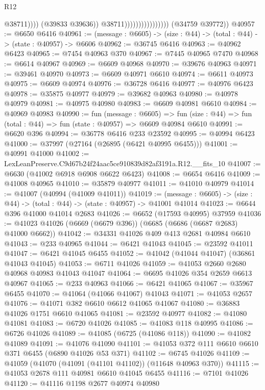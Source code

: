\begin{lexlean}{R12}
\begin{coremodule}
                                                @38711))))
                                        (@39833 @39636))
                                      @38711))))))))))))))))
      (@34759 @39772))
@40957 := @6650 @6416
@40961 := (message : @6605) -> (size : @44) -> (total : @44) -> (state : @40957) -> @6606
@40962 := @36745 @6416
@40963 := @40962 @6423
@40965 := @7454 @40963 @370
@40967 := @7445 @40965 @7470
@40968 := @6614 @40967
@40969 := @6609 @40968
@40970 := @39676 @40963
@40971 := @39461 @40970
@40973 := @6609 @40971 @6610
@40974 := @6611 @40973
@40975 := @6609 @40974
@40976 := @36728 @6416
@40977 := @40976 @6423
@40978 := @35875 @40977
@40979 := @39682 @40963
@40980 := @40978 @40979
@40981 := @40975 @40980
@40983 := @6609 @40981 @6610
@40984 := @40969 @40983
@40990 := fun (message : @6605) =>
  fun (size : @44) => fun (total : @44) => fun (state : @40957) => @6609 @40984 @6610
@40991 := @6620 @396
@40994 := @36778 @6416 @233 @23592
@40995 := @40994 @6423
@41000 := @37997 (@27164 (@26895 (@6421 @40995 @6455)))
@41001 := @40991 @41000
@41002 := LexLeanPreserve.C9d67b24f24aac5ce910839d82af3191a.R12.__fits_10
@41007 := @6630 (@41002 @6918 @6908 @6622 @6423)
@41008 := @6654 @6416
@41009 := @41008 @40965
@41010 := @35879 @40977
@41011 := @41010 @40979
@41014 := @41007 (@40994 (@41009 @41011))
@41019 := (message : @6605) -> (size : @44) -> (total : @44) -> (state : @40957) -> @41001 @41014
@41023 := @6644 @396 @41000 @41014 @2683
@41026 := @6652 (@17593 @40995) @37959
@41036 := @41023 @41026 (@6669 (@6679 @396)) (@6685 (@6686 (@6687 @2683) @41000 @6662))
@41042 := @34331 @41026 @409 @413 @2681 @40984 @6610
@41043 := @233 @40965
@41044 := @6421 @41043
@41045 := @23592 @41011
@41047 := @6421 @41045 @6455
@41052 := @41042 (@41044 @41047) (@36861 @41043 @41045)
@41053 := @6711 @41026
@41059 := @41053 @2660 @2680 @40968 @40983 @41043 @41047
@41064 := @6695 @41026 @354 @2659 @6613 @40967
@41065 := @233 @40963
@41066 := @6421 @41065
@41067 := @35967 @6455
@41070 := @41064 (@41066 @41067) @41043
@41071 := @41053 @2657
@41076 := @41071 @382 @6610 @6612 @41065 @41067
@41080 := @36883 @41026 @1751 @6610 @41065
@41081 := @23592 @40977
@41082 := @41080 @41081
@41083 := @6720 @41026
@41085 := @41083 @118 @40995
@41086 := @6726 @41026
@41089 := @41085 (@6725 (@41086 @118))
@41090 := @41082 @41089
@41091 := @41076 @41090
@41101 := @41053 @372 @111 @6610 @6610 @371 @6455 (@6890 @41026 @53 @371)
@41102 := @6745 @41026
@41109 := @41059 (@41070 (@41091 (@41101 @41102)) (@11648 @40963 @370))
@41115 := @41053 @2678 @111 @40981 @6610 @41045 @6455
@41116 := @7101 @41026
@41120 := @41116 @1198 @2677 @40974 @40980

\end{coremodule}
\end{lexlean}

